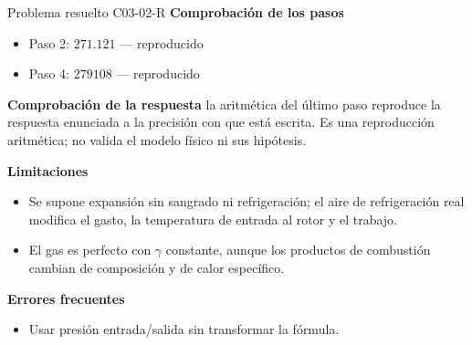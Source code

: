 \documentclass[10pt,openany]{book}
\begin{document}
\begin{studiumworked}{Problema resuelto C03-02-R}
\noindent\textbf{Comprobación de los pasos}
\begin{itemize}
\item Paso 2: $271.121$ — reproducido
\item Paso 4: $279108$ — reproducido
\end{itemize}

\noindent\textbf{Comprobación de la respuesta} la aritmética del último paso reproduce la respuesta enunciada a la precisión con que está escrita. Es una reproducción aritmética; no valida el modelo físico ni sus hipótesis.

\noindent\textbf{Limitaciones}
\begin{itemize}
\item Se supone expansión sin sangrado ni refrigeración; el aire de refrigeración real modifica el gasto, la temperatura de entrada al rotor y el trabajo.
\item El gas es perfecto con $\gamma$ constante, aunque los productos de combustión cambian de composición y de calor específico.
\end{itemize}

\noindent\textbf{Errores frecuentes}
\begin{itemize}
\item Usar presión entrada/salida sin transformar la fórmula.
\end{itemize}
\end{studiumworked}
\end{document}

